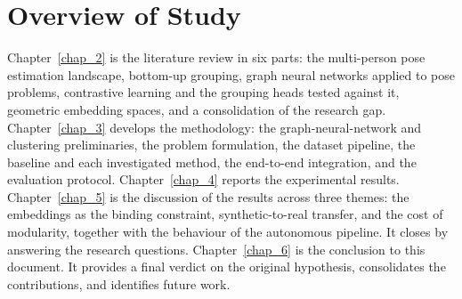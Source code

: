 \section{Overview of Study}
\label{sec_intro_overview}

Chapter~\ref{chap_2} is the literature review in six parts:
the multi-person pose estimation landscape, bottom-up grouping,
graph neural networks applied to pose problems,
contrastive learning and the grouping heads tested against it,
geometric embedding spaces, and a consolidation of the research gap.
Chapter~\ref{chap_3} develops the methodology:
the graph-neural-network and clustering preliminaries, the problem formulation, the dataset pipeline,
the baseline and each investigated method,
the end-to-end integration, and the evaluation protocol.
Chapter~\ref{chap_4} reports the experimental results.
Chapter~\ref{chap_5} is the discussion of the results across three themes:
the embeddings as the binding constraint, synthetic-to-real transfer,
and the cost of modularity, together with the behaviour of the autonomous pipeline.
It closes by answering the research questions.
Chapter~\ref{chap_6} is the conclusion to this document. It provides a final verdict on the
original hypothesis, consolidates the contributions, and identifies future work.